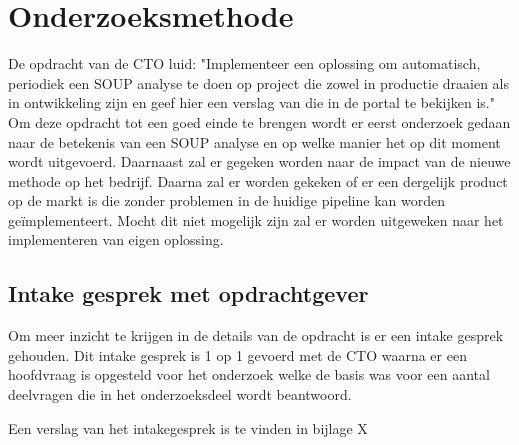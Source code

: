 
\chapter{Onderzoeksmethode} %

\label{OnderzoeksMethode} %

De opdracht van de CTO luid: "Implementeer een oplossing om automatisch, periodiek een SOUP analyse te doen op project die zowel in productie draaien als in ontwikkeling zijn en geef hier een verslag van die in de portal te bekijken is." Om deze opdracht tot een goed einde te brengen wordt er eerst onderzoek gedaan naar de betekenis van een SOUP analyse en op welke manier het op dit moment wordt uitgevoerd. Daarnaast zal er gegeken worden naar de impact van de nieuwe methode op het bedrijf. Daarna zal er worden gekeken of er een dergelijk product op de markt is die zonder problemen in de huidige pipeline kan worden ge\"implementeert. Mocht dit niet mogelijk zijn zal er worden uitgeweken naar het implementeren van eigen oplossing.\\
 
\section{Intake gesprek met opdrachtgever}
Om meer inzicht te krijgen in de details van de opdracht is er een intake gesprek gehouden. Dit intake gesprek is 1 op 1 gevoerd met de CTO waarna er een hoofdvraag is opgesteld voor het onderzoek welke de basis was voor een aantal deelvragen die in het onderzoeksdeel wordt beantwoord. 

Een verslag van het intakegesprek is te vinden in bijlage X%

